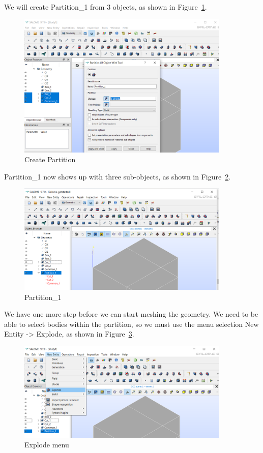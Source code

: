 We will create Partition\_1 from 3 objects, as shown in Figure~\ref{fg:salome-12}.

\begin{figure}[H]
\centering
\includegraphics[width=0.9\textwidth]{Salome-12}
\caption{Create Partition}\label{fg:salome-12}
\end{figure}

Partition\_1 now shows up with three sub-objects, as shown in Figure~\ref{fg:salome-13}.  

\begin{figure}[H]
\centering
\includegraphics[width=0.9\textwidth]{Salome-13}
\caption{Partition\_1}\label{fg:salome-13}
\end{figure}

We have one more step before we can start meshing the geometry.  We need to be able to select bodies within the partition, so we must use the menu selection New Entity -> Explode, as shown in Figure~\ref{fg:salome-14}.

\begin{figure}[H]
\centering
\includegraphics[width=0.9\textwidth]{Salome-14}
\caption{Explode menu}\label{fg:salome-14}
\end{figure}

